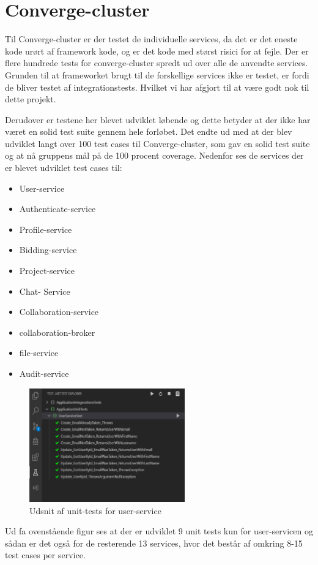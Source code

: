 \chapter{Converge-cluster}
Til Converge-cluster er der testet de individuelle services, da det er det eneste kode urørt af framework kode, og er det kode med størst risici for at fejle. Der er flere hundrede tests for converge-cluster spredt ud over alle de anvendte services. Grunden til at frameworket brugt til de forskellige services ikke er testet, er fordi de bliver testet af integrationstests. Hvilket vi har afgjort til at være godt nok til dette projekt. 

Derudover er testene her blevet udviklet løbende og dette betyder at der ikke har været en solid test suite gennem hele forløbet. Det endte ud med at der blev udviklet langt over 100 test cases til Converge-cluster, som gav en solid test suite og at nå gruppens mål på de 100 procent coverage. 
Nedenfor ses de services der er blevet udviklet test cases til:

\begin{itemize}
    \item User-service 
	\item Authenticate-service 
	\item Profile-service 
    \item Bidding-service 
	\item Project-service 
    \item Chat- Service 
	\item Collaboration-service 
	\item collaboration-broker
	\item file-service
	\item Audit-service 
\end{itemize}


\begin{figure}[ht]
    \centering
\includegraphics[width=0.6\textwidth]{Unit-Test-image/user-service-UnitTest.pdf}
\caption{Udsnit af unit-tests for user-service}
\label{fig:figure2}
\end{figure}

Ud fa ovenstående figur ses at der er udviklet 9 unit tests kun for user-servicen og sådan er det også for de resterende 13 services, hvor det består af omkring 8-15 test cases per service. 
